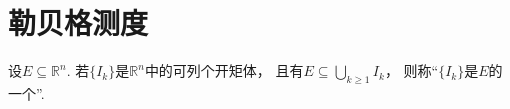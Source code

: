 \chapter{勒贝格测度}
\begin{definition}
设\(E \subseteq \mathbb{R}^n\).
若\(\{I_k\}\)是\(\mathbb{R}^n\)中的可列个开矩体，
且有\(E \subseteq \bigcup_{k\geq1} I_k\)，
则称“\(\{I_k\}\)是\(E\)的一个”.
\end{definition}

